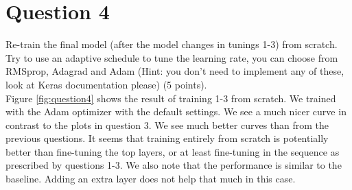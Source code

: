\documentclass[paper=a4, fontsize=11pt]{scrartcl}
\begin{document}
\section{Question 4}

{\small Re-train the final model (after the model changes in tunings 1-3) from scratch. Try to use an adaptive schedule to tune the learning rate, you can choose from RMSprop, Adagrad and Adam (Hint: you don't need to implement any of these, look at Keras documentation please) (5 points).}\\

Figure \ref{fig:question4} shows the result of training 1-3 from scratch.  We trained with the Adam optimizer with the default settings.  We see a much nicer curve in contrast to the plots in question 3.  We see much better curves than from the previous questions.  It seems that training entirely from scratch is potentially better than fine-tuning the top layers, or at least fine-tuning in the sequence as prescribed by questions 1-3.  We also note that the performance is similar to the baseline.  Adding an extra layer does not help that much in this case.
\end{document}
